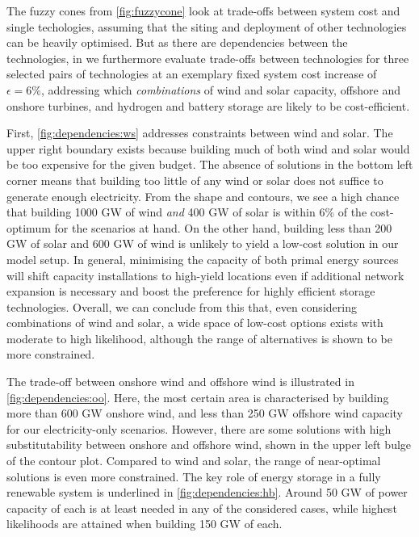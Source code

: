 The fuzzy cones from \cref{fig:fuzzycone} look at trade-offs between system cost
and single techologies, assuming that the siting and deployment of other
technologies can be heavily optimised. But as there are dependencies between the
technologies, in  we
furthermore evaluate trade-offs between technologies for three selected pairs of technologies at
an exemplary fixed system cost increase of $\epsilon=6\%$, addressing which
\textit{combinations} of wind and solar capacity, offshore and onshore turbines,
and hydrogen and battery storage are likely to be cost-efficient.

First, \cref{fig:dependencies:ws} addresses constraints between wind and solar.
The upper right boundary exists because building much of both wind and solar
would be too expensive for the given budget. The absence of solutions in the
bottom left corner means that building too little of any wind or solar does not
suffice to generate enough electricity. From the shape and contours, we see a
high chance that building 1000 GW of wind \textit{and} 400 GW of solar is within
6\% of the cost-optimum for the scenarios at hand. On the other hand, building
less than 200 GW of solar and 600 GW of wind is unlikely to yield a low-cost
solution in our model setup. In general, minimising the capacity of both primal
energy sources will shift capacity installations to high-yield locations even if
additional network expansion is necessary and boost the preference for highly
efficient storage technologies. Overall, we can conclude from this that, even
considering combinations of wind and solar, a wide space of low-cost options
exists with moderate to high likelihood, although the range of alternatives is
shown to be more constrained.

The trade-off between onshore wind and offshore wind is illustrated in
\cref{fig:dependencies:oo}. Here, the most certain area is characterised by
building more than 600 GW onshore wind, and less than 250 GW offshore wind
capacity for our electricity-only scenarios. However, there are some solutions
with high substitutability between onshore and offshore wind, shown in the upper
left bulge of the contour plot. Compared to wind and solar, the range of
near-optimal solutions is even more constrained. The key role of energy storage
in a fully renewable system is underlined in \cref{fig:dependencies:hb}. Around
50 GW of power capacity of each is at least needed in any of the considered
cases, while highest likelihoods are attained when building 150 GW of each.

